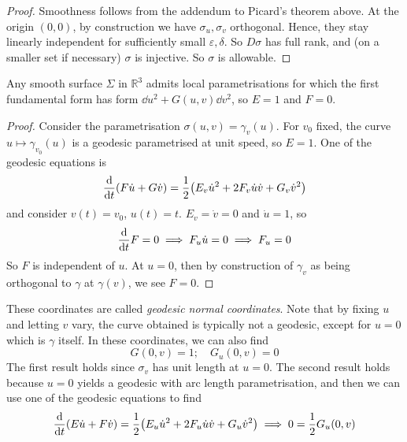 \begin{proof}
	Smoothness follows from the addendum to Picard's theorem above.
	At the origin \( (0,0) \), by construction we have \( \sigma_u, \sigma_v \) orthogonal.
	Hence, they stay linearly independent for sufficiently small \( \varepsilon, \delta \).
	So \( D\sigma \) has full rank, and (on a smaller set if necessary) \( \sigma \) is injective.
	So \( \sigma \) is allowable.
\end{proof}
\begin{corollary}
	Any smooth surface \( \Sigma \) in \( \mathbb R^3 \) admits local parametrisations for which the first fundamental form has form \( \dd{u}^2 + G(u,v) \dd{v}^2 \), so \( E = 1 \) and \( F = 0 \).
\end{corollary}
\begin{proof}
	Consider the parametrisation \( \sigma(u,v) = \gamma_v(u) \).
	For \( v_0 \) fixed, the curve \( u \mapsto \gamma_{v_0}(u) \) is a geodesic parametrised at unit speed, so \( E = 1 \).
	One of the geodesic equations is
	\[
		\dv{t} \qty(F \dot u + G \dot v) = \frac{1}{2} \qty(E_v \dot u^2 + 2F_v \dot u \dot v + G_v \dot v^2)
	\]
	and consider \( v(t) = v_0 \), \( u(t) = t \).
	\( E_v = \dot v = 0 \) and \( \dot u = 1 \), so
	\[
		\dv{t} F = 0 \implies F_u \dot u = 0 \implies F_u = 0
	\]
	So \( F \) is independent of \( u \).
	At \( u = 0 \), then by construction of \( \gamma_v \) as being orthogonal to \( \gamma \) at \( \gamma(v) \), we see \( F = 0 \).
\end{proof}
These coordinates are called \textit{geodesic normal coordinates}.
Note that by fixing \( u \) and letting \( v \) vary, the curve obtained is typically not a geodesic, except for \( u = 0 \) which is \( \gamma \) itself.
In these coordinates, we can also find
\[
	G(0,v) = 1;\quad G_u(0,v) = 0
\]
The first result holds since \( \sigma_v \) has unit length at \( u = 0 \).
The second result holds because \( u = 0 \) yields a geodesic with arc length parametrisation, and then we can use one of the geodesic equations to find
\[
	\dv{t} \qty(E \dot u + F \dot v) = \frac{1}{2}\qty(E_u \dot u^2 + 2F_u \dot u \dot v + G_u \dot v^2) \implies 0 = \frac{1}{2} G_u(0,v)
\]


